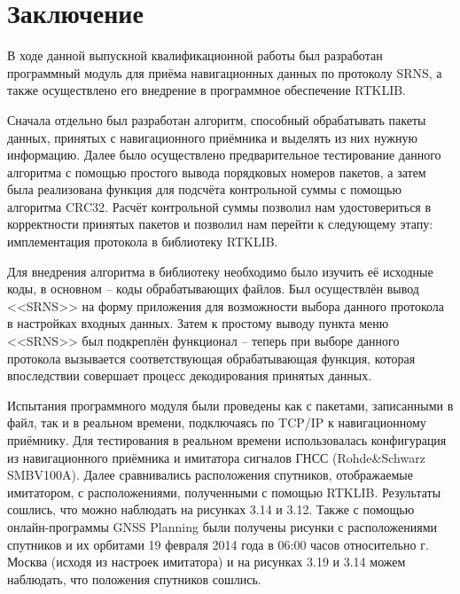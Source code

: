 \chapter*{Заключение} %
В ходе данной выпускной квалификационной работы был разработан программный модуль для приёма навигационных данных по протоколу SRNS, а также осуществлено его внедрение в программное обеспечение RTKLIB.

Сначала отдельно был разработан алгоритм, способный обрабатывать пакеты данных, принятых с навигационного приёмника и выделять из них нужную информацию. Далее было осуществлено предварительное тестирование данного алгоритма с помощью простого вывода порядковых номеров пакетов, а затем была реализована функция для подсчёта контрольной суммы с помощью алгоритма CRC32. Расчёт контрольной суммы позволил нам удостовериться в корректности принятых пакетов и позволил нам перейти к следующему этапу: имплементация протокола в библиотеку RTKLIB.

Для внедрения алгоритма в библиотеку необходимо было изучить её исходные коды, в основном -- коды обрабатывающих файлов. Был осуществлён вывод <<SRNS>> на форму приложения для возможности выбора данного протокола в настройках входных данных. Затем к простому выводу пункта меню <<SRNS>> был подкреплён функционал -- теперь при выборе данного протокола вызывается соответствующая обрабатывающая функция, которая впоследствии совершает процесс декодирования принятых данных.

Испытания программного модуля были проведены как с пакетами, записанными в файл, так и в реальном времени, подключаясь по TCP/IP к навигационному приёмнику. Для тестирования в реальном времени использовалась конфигурация из навигационного приёмника и имитатора сигналов ГНСС (Rohde\&Schwarz SMBV100A). Далее сравнивались расположения спутников, отображаемые имитатором, с расположениями, полученными с помощью RTKLIB. Результаты сошлись, что можно наблюдать на рисунках 3.14 и 3.12. Также с помощью онлайн-программы GNSS Planning были получены рисунки с расположениями спутников и их орбитами 19 февраля 2014 года в 06:00 часов относительно г. Москва (исходя из настроек имитатора) и на рисунках 3.19 и 3.14 можем наблюдать, что положения спутников сошлись.




